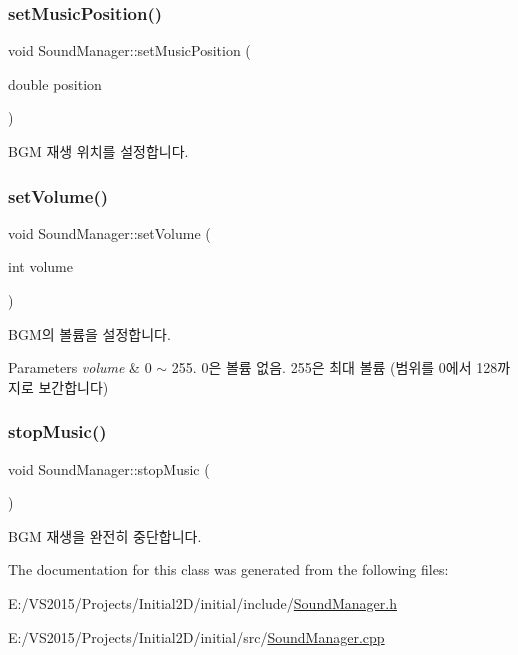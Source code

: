 \subsubsection{\texorpdfstring{setMusicPosition()}{setMusicPosition()}}
{\footnotesize\ttfamily void Sound\+Manager\+::set\+Music\+Position (\begin{DoxyParamCaption}\item[{double}]{position }\end{DoxyParamCaption})}

B\+GM 재생 위치를 설정합니다. \mbox{\label{class_sound_manager_ad46266a6f6bae4bfeeaacd687c172518}} 
\subsubsection{\texorpdfstring{setVolume()}{setVolume()}}
{\footnotesize\ttfamily void Sound\+Manager\+::set\+Volume (\begin{DoxyParamCaption}\item[{int}]{volume }\end{DoxyParamCaption})}

B\+G\+M의 볼륨을 설정합니다.


\begin{DoxyParams}{Parameters}
{\em volume} & 0 $\sim$ 255. 0은 볼륨 없음. 255은 최대 볼륨 (범위를 0에서 128까지로 보간합니다) \\
\hline
\end{DoxyParams}
\mbox{\label{class_sound_manager_a9aae750c8c9a1fc80abd49b5c95c95ec}} 
\subsubsection{\texorpdfstring{stopMusic()}{stopMusic()}}
{\footnotesize\ttfamily void Sound\+Manager\+::stop\+Music (\begin{DoxyParamCaption}{ }\end{DoxyParamCaption})}

B\+GM 재생을 완전히 중단합니다. 

The documentation for this class was generated from the following files\+:\begin{DoxyCompactItemize}
\item 
E\+:/\+V\+S2015/\+Projects/\+Initial2\+D/initial/include/\mbox{\hyperlink{_sound_manager_8h}{Sound\+Manager.\+h}}\item 
E\+:/\+V\+S2015/\+Projects/\+Initial2\+D/initial/src/\mbox{\hyperlink{_sound_manager_8cpp}{Sound\+Manager.\+cpp}}\end{DoxyCompactItemize}
